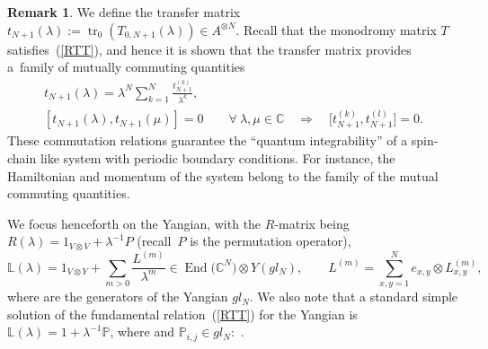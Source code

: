 \documentclass[10pt,a4paper]{amsart}
\numberwithin{equation}{section}
\theoremstyle{definition}
\newtheorem{rem}[thm]{Remark}
\DeclareMathOperator{\EEnd}{End}%
\def\mathfrak#1{#1}%
\def\mathcal#1{#1}%
\begin{document}
\begin{rem}{\label{tt}} We define the transfer matrix ${\mathfrak t}_{N+1}(\lambda) := \operatorname{tr}_0 (T_{0,N+1}(\lambda)) \in
{\mathfrak A}^{\otimes N}$.
Recall that the monodromy matrix $T$ satisfies~(\ref{RTT}), and hence it is shown that the transfer matrix provides a~family of mutually
commuting quantities~\cite{FadTakRes}
\begin{gather*}
{\mathfrak t}_{N+1}(\lambda) =\lambda^N \sum_{k=1}^N \frac{{\mathfrak t}_{N+1}^{(k)}}{\lambda^k},\\
[ {\mathfrak t}_{N+1}(\lambda), {\mathfrak t}_{N+1}(\mu)] =0\qquad \forall\ \lambda, \mu \in {\mathbb C}\quad \Rightarrow\quad \bigl[ {\mathfrak t}_{N+1}^{(k)}, {\mathfrak t}_{N+1}^{(l)}\bigr] =0.
\end{gather*}
These commutation relations guarantee the ``quantum integrability'' of a spin-chain like system with periodic boundary conditions. For instance, the Hamiltonian and momentum of the system belong to the family of the mutual commuting quantities.
\end{rem}

We focus henceforth on the Yangian, with the $R$-matrix being $R(\lambda) = 1_{V \otimes V} + \lambda^{-1}{\mathcal P}$ (recall~${\mathcal P}$ is the permutation operator),
\[
{\mathbb L}(\lambda) =1_{V \otimes {\mathcal Y}} + \sum_{m>0}\frac{L^{(m)}}{\lambda^m} \in \EEnd\bigl({\mathbb C}^{\mathcal N}\bigr) \otimes
{\mathcal Y}(\mathfrak{gl}_{\mathcal N}), \qquad L^{(m)} = \sum_{x, y=1}^{{\mathcal N}} e_{x, y} \otimes L^{(m)}_{x,y},\]
where
 are the generators of the Yangian $\mathfrak{gl}_{\mathcal N}$. We also note that a standard simple solution of the fundamental relation~(\ref{RTT}) for the Yangian is ${\mathbb L}(\lambda) = 1 +\lambda^{-1} {\mathbb P}$, where \smash{${\mathbb P} = \sum_{i,j =1}^{\mathcal N} e_{i,j} \otimes {\mathbb P}_{i,j}$} and ${\mathbb P}_{i,j} \in \mathfrak{gl}_{\mathcal N}:$ .
\end{document}
